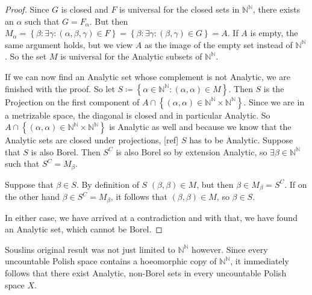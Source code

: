 \documentclass[10pt, a4paper, titlepage]{article}
\numberwithin{equation}{section}
\begin{document}
\begin{proof}
Since $G$ is closed and $F$ is universal for the closed sets in
$\mathbb{N}^\mathbb{N}$, there exists an $\alpha$ such that  $G = F_{\alpha}$.
But then $M_\alpha = \left\{ \beta : \exists \gamma: \left( \alpha, \beta,
\gamma \right) \in F \right\} = \left\{ \beta: \exists \gamma: \left(
\beta,\gamma \right) \in G \right\} = A $. 
If $A$ is empty, the same argument holds, but we view  $A$ as the image of the
empty set instead of  $\mathbb{N}^\mathbb{N}$.
So the set $M$ is universal for the
Analytic subsets of $\mathbb{N}^\mathbb{N}.$

If we can now find an Analytic set whose complement is not Analytic, we are
finished with the proof.
So let $S \coloneq \left\{ \alpha \in \mathbb{N}^\mathbb{N}: \left( \alpha,
\alpha \right) \in M \right\} $. 
Then $S$ is the Projection on the first component of  $A \cap \left\{ \left( \alpha,
\alpha \right) \in  \mathbb{N}^\mathbb{N} \times \mathbb{N}^\mathbb{N}
\right\}$. Since we are in a metrizable space, the diagonal is closed and in
particular Analytic. So $A \cap \left\{ \left( \alpha, \alpha \right) \in
\mathbb{N}^\mathbb{N} \times \mathbb{N}^\mathbb{N} \right\} $ is Analytic as
well and because we know that the Analytic sets are closed under projections,
[ref] $S$ has to be Analytic. 
Suppose that $S$ is also Borel. Then $S^C$ is also Borel so by extension
Analytic, so $\exists \beta \in \mathbb{N}^\mathbb{N}$ such that $S^C =
M_{\beta}$.

Suppose that $\beta \in S$. By definition of $S$  $\left( \beta,\beta \right)
\in M $, but then $\beta \in M_{\beta} = S^C$.
If on the other hand $\beta \in S^C = M_{\beta}$, it follows that $\left(
\beta,\beta \right) \in M$, so $\beta \in S$.

In either case, we have arrived at a contradiction and with that, we have found an
Analytic set, which cannot be Borel.
\end{proof}

Souslins original result was not just limited to $\mathbb{N}^\mathbb{N}$ however.
Since every uncountable Polish space contains a hoeomorphic copy of $\mathbb{N}^\mathbb{N}$, 
it immediately follows that there exist Analytic, 
non-Borel sets in every uncountable Polish space $X$.
\end{document}
